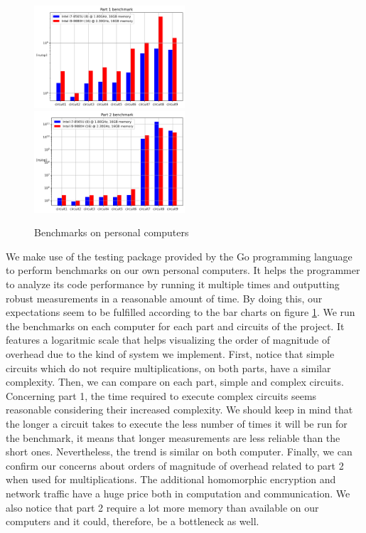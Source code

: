 \documentclass[10pt,conference]{IEEEtran}
\begin{document}
\begin{figure}[h]
  \caption{Benchmarks on personal computers}
  \label{fig:bench}
  \includegraphics[width=0.5\textwidth]{Part_1_benchmark.png}
  \includegraphics[width=0.5\textwidth]{Part_2_benchmark.png}
\end{figure}

We make use of the testing package provided by the Go programming language to perform benchmarks on our own personal computers. It helps the programmer to analyze its code performance by running it multiple times and outputting robust measurements in a reasonable amount of time. By doing this, our expectations seem to be fulfilled according to the bar charts on figure \ref{fig:bench}. We run the benchmarks on each computer for each part and circuits of the project. It features a logaritmic scale that helps visualizing the order of magnitude of overhead due to the kind of system we implement. First, notice that simple circuits which do not require multiplications, on both parts, have a similar complexity. Then, we can compare on each part, simple and complex circuits. Concerning part 1, the time required to execute complex circuits seems reasonable considering their increased complexity. We should keep in mind that the longer a circuit takes to execute the less number of times it will be run for the benchmark, it means that longer measurements are less reliable than the short ones. Nevertheless, the trend is similar on both computer. Finally, we can confirm our concerns about orders of magnitude of overhead related to part 2 when used for multiplications. The additional homomorphic encryption and network traffic have a huge price both in computation and communication. We also notice that part 2 require a lot more memory than available on our computers and it could, therefore, be a bottleneck as well.
\end{document}

